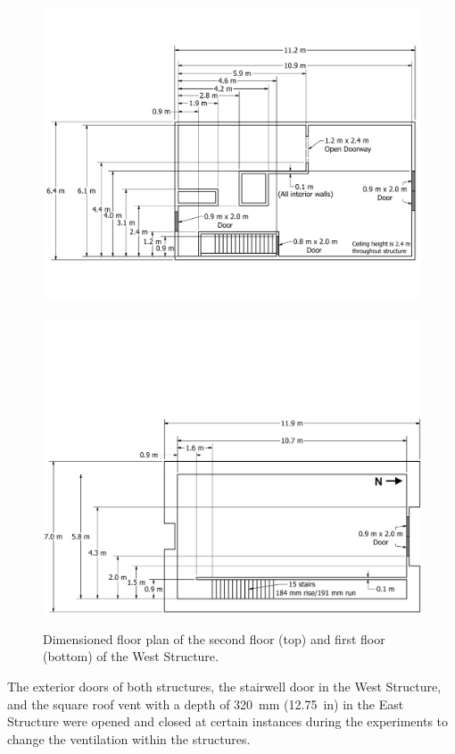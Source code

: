 \begin{figure}[!h]
	\centering
	\includegraphics[width=\columnwidth]{Figures/Floor_Plans/West_Structure_2nd_Floor_Dimensioned_Full}
	\\~\\
	\includegraphics[width=\columnwidth]{Figures/Floor_Plans/West_Structure_1st_Floor_Dimensioned_Full}
	\caption[Dimensioned floor plans of the West Structure]{Dimensioned floor plan of the second floor (top) and first floor (bottom) of the West Structure.}
	\label{fig:west_dimensioned_plan}
\end{figure}
\clearpage
The exterior doors of both structures, the stairwell door in the West Structure, and the square roof vent with a depth of 320~mm (12.75~in) in the East Structure were opened and closed at certain instances during the experiments to change the ventilation within the structures.

